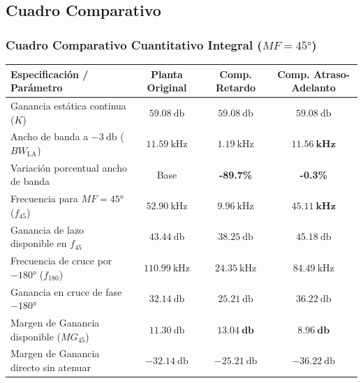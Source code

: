 \subsection{Cuadro Comparativo}
\begin{frame}
  \frametitle{Cuadro Comparativo Cuantitativo Integral ($MF = \ang{45}$)}

  \begin{tarjeta}
    \centering
    \setlength{\tabcolsep}{3.2pt}
    \renewcommand{\arraystretch}{1.08}
    {\fontsize{7.2pt}{9.0pt}\selectfont
    \begin{tabular}{lccc}
      \toprule
      \textbf{Especificación / Parámetro} & \textbf{Planta Original} & \textbf{Comp. Retardo} & \textbf{Comp. Atraso-Adelanto} \\
      \midrule
      Ganancia estática continua ($K$) & $\qty{59.08}{\decibel}$ & $\qty{59.08}{\decibel}$ & $\qty{59.08}{\decibel}$ \\
      Ancho de banda a $\qty{-3}{\decibel}$ ($BW_{\text{LA}}$) & $\qty{11.59}{\kilo\hertz}$ & $\qty{1.19}{\kilo\hertz}$ & $\mathbf{\qty{11.56}{\kilo\hertz}}$ \\
      Variación porcentual ancho de banda & Base & \textbf{-89.7\%} & \textbf{-0.3\%} \\
      Frecuencia para $MF = \ang{45}$ ($f_{45}$) & $\qty{52.90}{\kilo\hertz}$ & $\qty{9.96}{\kilo\hertz}$ & $\mathbf{\qty{45.11}{\kilo\hertz}}$ \\
      Ganancia de lazo disponible en $f_{45}$ & $\qty{43.44}{\decibel}$ & $\qty{38.25}{\decibel}$ & $\qty{45.18}{\decibel}$ \\
      Frecuencia de cruce por $\ang{-180}$ ($f_{180}$) & $\qty{110.99}{\kilo\hertz}$ & $\qty{24.35}{\kilo\hertz}$ & $\qty{84.49}{\kilo\hertz}$ \\
      Ganancia en cruce de fase $\ang{-180}$ & $\qty{32.14}{\decibel}$ & $\qty{25.21}{\decibel}$ & $\qty{36.22}{\decibel}$ \\
      Margen de Ganancia disponible ($MG_{45}$) & $\qty{11.30}{\decibel}$ & $\mathbf{\qty{13.04}{\decibel}}$ & $\mathbf{\qty{8.96}{\decibel}}$ \\
      Margen de Ganancia directo sin atenuar & $\qty{-32.14}{\decibel}$ & $\qty{-25.21}{\decibel}$ & $\qty{-36.22}{\decibel}$ \\
      \bottomrule
    \end{tabular}
    }
  \end{tarjeta}
\end{frame}

